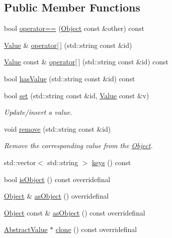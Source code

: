\subsection*{Public Member Functions}
\begin{DoxyCompactItemize}
\item 
bool \hyperlink{classj_1_1impl_1_1_object_ac66a504ae3a4592ad30176e3793bb90b}{operator==} (\hyperlink{classj_1_1impl_1_1_object}{Object} const \&other) const 
\item 
\hyperlink{classj_1_1_value}{Value} \& \hyperlink{classj_1_1impl_1_1_object_a2d132ef8f3e39ed354f6b2dcba3f6d45}{operator\mbox{[}$\,$\mbox{]}} (std\-::string const \&id)
\item 
\hyperlink{classj_1_1_value}{Value} const \& \hyperlink{classj_1_1impl_1_1_object_a2b56837fa3193cf76336216582383e9c}{operator\mbox{[}$\,$\mbox{]}} (std\-::string const \&id) const 
\item 
bool \hyperlink{classj_1_1impl_1_1_object_a1d870692cda482740f27d1ad877ee51b}{has\-Value} (std\-::string const \&id) const 
\item 
bool \hyperlink{classj_1_1impl_1_1_object_ac47b12fd0b97384c30394afd5225597f}{set} (std\-::string const \&id, \hyperlink{classj_1_1_value}{Value} const \&v)
\begin{DoxyCompactList}\small\item\em Update/insert a value. \end{DoxyCompactList}\item 
void \hyperlink{classj_1_1impl_1_1_object_a36d5a27d393f926a2fbeadb68f50b84a}{remove} (std\-::string const \&id)
\begin{DoxyCompactList}\small\item\em Remove the corresponding value from the \hyperlink{classj_1_1impl_1_1_object}{Object}. \end{DoxyCompactList}\item 
std\-::vector$<$ std\-::string $>$ \hyperlink{classj_1_1impl_1_1_object_ac43317d715c065f0e8b4ca40663a3341}{keys} () const 
\item 
bool \hyperlink{classj_1_1impl_1_1_object_a1a4c68884081496e04f4a84684980871}{is\-Object} () const overridefinal
\item 
\hyperlink{classj_1_1impl_1_1_object}{Object} \& \hyperlink{classj_1_1impl_1_1_object_aad1449adafdd83c980a03061ebf197c0}{as\-Object} () overridefinal
\item 
\hyperlink{classj_1_1impl_1_1_object}{Object} const \& \hyperlink{classj_1_1impl_1_1_object_a931f6aabe40406eb81106d0ec45ac1bd}{as\-Object} () const overridefinal
\item 
\hyperlink{classj_1_1impl_1_1_abstract_value}{Abstract\-Value} $\ast$ \hyperlink{classj_1_1impl_1_1_object_a7485852de6358152ec02e2e4023e3600}{clone} () const overridefinal
\end{DoxyCompactItemize}
